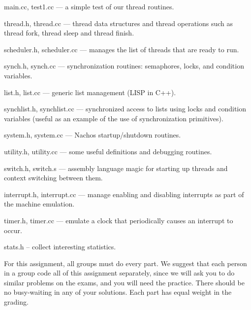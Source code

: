 \begin{description}

\item main.cc, test1.cc --- a simple test of our thread routines.

\item thread.h, thread.cc --- thread data structures and
thread operations such as thread fork, thread sleep and thread finish.

\item scheduler.h, scheduler.cc --- manages the list of threads that
are ready to run.

\item synch.h, synch.cc --- synchronization routines: semaphores, locks, 
and condition variables.

\item list.h, list.cc --- generic list management (LISP in C++).

\item synchlist.h, synchlist.cc --- synchronized access to lists using
locks and condition variables (useful as an example of the use 
of synchronization primitives).

\item system.h, system.cc --- Nachos startup/shutdown routines.

\item utility.h, utility.cc --- some useful definitions and debugging routines.

\item switch.h, switch.s --- assembly language magic for starting 
up threads and context switching between them.

\item interrupt.h, interrupt.cc --- manage enabling and disabling
interrupts as part of the machine emulation.

\item timer.h, timer.cc --- emulate a clock that periodically causes 
an interrupt to occur.

\item stats.h -- collect interesting statistics.

\end{description}

For this assignment, all groups must do every part.  We suggest that 
each person in a group code all of this assignment separately, since 
we will ask you to do similar problems on the exams, and you will
need the practice.  There should be no busy-waiting in any of your 
solutions.  Each part has equal weight in the grading.

